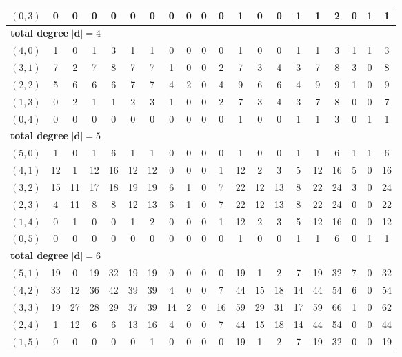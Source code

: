 \documentclass{article}
\newcommand{\bd}{\mathbf{d}}
\begin{document}
\begin{longtable}{|c|c|c|c|c|c|c|c|c|c|c|c|c|c|c|c|c|c|c|c|}
$(0,3)$ & 0 & 0 & 0 & 0 & 0 & 0 & 0 & 0 & 0 & 0 & 1 & 0 & 0 & 1 & 1 & 2 & 0 & 1 & 1 \\ \hline
\multicolumn{20}{|l|}{\textbf{total degree }$|\bd|=4$} \\ \hline
$(4,0)$ & 1 & 0 & 1 & 3 & 1 & 1 & 0 & 0 & 0 & 0 & 1 & 0 & 0 & 1 & 1 & 3 & 1 & 1 & 3 \\ \hline
$(3,1)$ & 7 & 2 & 7 & 8 & 7 & 7 & 1 & 0 & 0 & 2 & 7 & 3 & 4 & 3 & 7 & 8 & 3 & 0 & 8 \\ \hline
$(2,2)$ & 5 & 6 & 6 & 6 & 7 & 7 & 4 & 2 & 0 & 4 & 9 & 6 & 6 & 4 & 9 & 9 & 1 & 0 & 9 \\ \hline
$(1,3)$ & 0 & 2 & 1 & 1 & 2 & 3 & 1 & 0 & 0 & 2 & 7 & 3 & 4 & 3 & 7 & 8 & 0 & 0 & 7 \\ \hline
$(0,4)$ & 0 & 0 & 0 & 0 & 0 & 0 & 0 & 0 & 0 & 0 & 1 & 0 & 0 & 1 & 1 & 3 & 0 & 1 & 1 \\ \hline
\multicolumn{20}{|l|}{\textbf{total degree }$|\bd|=5$} \\ \hline
$(5,0)$ & 1 & 0 & 1 & 6 & 1 & 1 & 0 & 0 & 0 & 0 & 1 & 0 & 0 & 1 & 1 & 6 & 1 & 1 & 6 \\ \hline
$(4,1)$ & 12 & 1 & 12 & 16 & 12 & 12 & 0 & 0 & 0 & 1 & 12 & 2 & 3 & 5 & 12 & 16 & 5 & 0 & 16 \\ \hline
$(3,2)$ & 15 & 11 & 17 & 18 & 19 & 19 & 6 & 1 & 0 & 7 & 22 & 12 & 13 & 8 & 22 & 24 & 3 & 0 & 24 \\ \hline
$(2,3)$ & 4 & 11 & 8 & 8 & 12 & 13 & 6 & 1 & 0 & 7 & 22 & 12 & 13 & 8 & 22 & 24 & 0 & 0 & 22 \\ \hline
$(1,4)$ & 0 & 1 & 0 & 0 & 1 & 2 & 0 & 0 & 0 & 1 & 12 & 2 & 3 & 5 & 12 & 16 & 0 & 0 & 12 \\ \hline
$(0,5)$ & 0 & 0 & 0 & 0 & 0 & 0 & 0 & 0 & 0 & 0 & 1 & 0 & 0 & 1 & 1 & 6 & 0 & 1 & 1 \\ \hline
\multicolumn{20}{|l|}{\textbf{total degree }$|\bd|=6$} \\ \hline
$(5,1)$ & 19 & 0 & 19 & 32 & 19 & 19 & 0 & 0 & 0 & 0 & 19 & 1 & 2 & 7 & 19 & 32 & 7 & 0 & 32 \\ \hline
$(4,2)$ & 33 & 12 & 36 & 42 & 39 & 39 & 4 & 0 & 0 & 7 & 44 & 15 & 18 & 14 & 44 & 54 & 6 & 0 & 54 \\ \hline
$(3,3)$ & 19 & 27 & 28 & 29 & 37 & 39 & 14 & 2 & 0 & 16 & 59 & 29 & 31 & 17 & 59 & 66 & 1 & 0 & 62 \\ \hline
$(2,4)$ & 1 & 12 & 6 & 6 & 13 & 16 & 4 & 0 & 0 & 7 & 44 & 15 & 18 & 14 & 44 & 54 & 0 & 0 & 44 \\ \hline
$(1,5)$ & 0 & 0 & 0 & 0 & 0 & 1 & 0 & 0 & 0 & 0 & 19 & 1 & 2 & 7 & 19 & 32 & 0 & 0 & 19 \\ \hline

\end{longtable}
\end{document}
